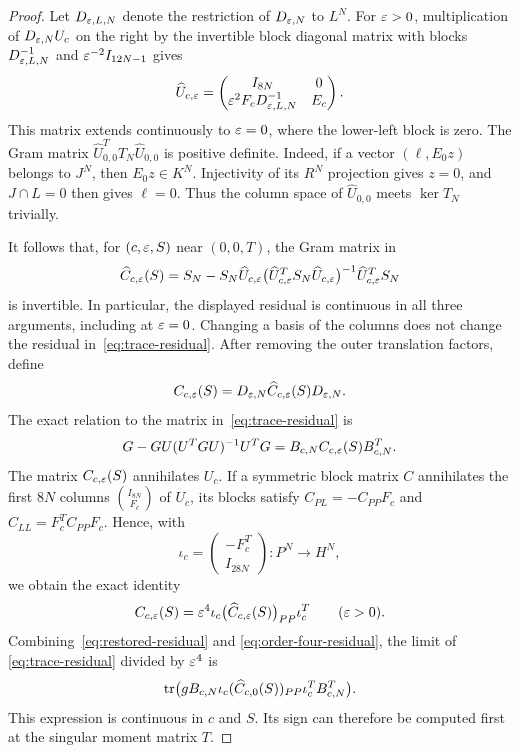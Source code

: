 \begin{proof}
Let $D_{\varepsilon,L,N}$ denote the restriction of $D_{\varepsilon,N}$ to $L^N$.
For $\varepsilon>0$, multiplication of $D_{\varepsilon,N}U_c$ on the right by the
invertible block diagonal matrix with blocks $D_{\varepsilon,L,N}^{-1}$ and
$\varepsilon^{-2}I_{12N-1}$ gives
\begin{equation}
 \label{eq:rescaled-U}
 \widehat U_{c,\varepsilon}
 =\begin{pmatrix}
 I_{8N}&0\\
 \varepsilon^2F_cD_{\varepsilon,L,N}^{-1}&E_c
 \end{pmatrix}.
\end{equation}
This matrix extends continuously to $\varepsilon=0$, where the lower-left block
is zero.  The Gram matrix
$\widehat U_{0,0}^TT_N\widehat U_{0,0}$ is positive definite.  Indeed,
if a vector $(\ell,E_0z)$ belongs to $J^N$, then $E_0z\in K^N$.
Injectivity of its $R^N$ projection gives $z=0$, and $J\cap L=0$ then
gives $\ell=0$.  Thus the column space of $\widehat U_{0,0}$ meets
$\ker T_N$ trivially.

It follows that, for $(c,\varepsilon,S)$ near $(0,0,T)$, the Gram matrix in
\begin{equation}
 \label{eq:rescaled-residual}
 \widehat C_{c,\varepsilon}(S)
 =S_N-S_N\widehat U_{c,\varepsilon}
  \bigl(\widehat U_{c,\varepsilon}^TS_N\widehat U_{c,\varepsilon}\bigr)^{-1}
  \widehat U_{c,\varepsilon}^TS_N
\end{equation}
is invertible.  In particular, the displayed residual is continuous in all
three arguments, including at $\varepsilon=0$.  Changing a basis of the columns
does not change the residual in~\eqref{eq:trace-residual}.  After removing
the outer translation factors, define
\[
 C_{c,\varepsilon}(S)=D_{\varepsilon,N}\widehat C_{c,\varepsilon}(S)D_{\varepsilon,N}.
\]
The exact relation to the matrix in~\eqref{eq:trace-residual} is
\begin{equation}
 \label{eq:restored-residual}
 G-GU(U^TGU)^{-1}U^TG
 =B_{c,N}C_{c,\varepsilon}(S)B_{c,N}^T.
\end{equation}
The matrix $C_{c,\varepsilon}(S)$ annihilates $U_c$.  If a symmetric block matrix
$C$ annihilates the
first $8N$ columns $\binom{I_{8N}}{F_c}$ of $U_c$, its blocks satisfy
$C_{PL}=-C_{PP}F_c$ and $C_{LL}=F_c^TC_{PP}F_c$.  Hence, with
\[
 \iota_c=\begin{pmatrix}-F_c^T\\I_{28N}\end{pmatrix}
 :P^N\longrightarrow H^N,
\]
we obtain the exact identity
\begin{equation}
 \label{eq:order-four-residual}
 C_{c,\varepsilon}(S)
 =\varepsilon^4\iota_c\bigl(\widehat C_{c,\varepsilon}(S)\bigr)_{PP}\iota_c^T
 \qquad(\varepsilon>0).
\end{equation}
Combining~\eqref{eq:restored-residual} and
\eqref{eq:order-four-residual}, the limit of
\eqref{eq:trace-residual} divided by $\varepsilon^4$ is
\begin{equation}
 \label{eq:continuous-leading-coefficient}
 \operatorname{tr}\bigl(gB_{c,N}\iota_c
       (\widehat C_{c,0}(S))_{PP}\iota_c^TB_{c,N}^T\bigr).
\end{equation}
This expression is continuous in $c$ and $S$.  Its sign can therefore be
computed first at the singular moment matrix $T$.


\end{proof}
